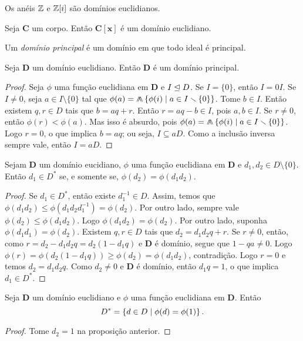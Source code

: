 \begin{exercise}
Os anéis $\mathbb{Z}$ e $\mathbb{Z}[i]$ são domínios euclidianos.
\end{exercise}

\begin{exercise}
Seja $\bm C$ um corpo. Então $\bm{C[x]}$ é um domínio euclidiano.
\end{exercise}

\begin{definition}
Um \emph{domínio principal} é um domínio em que todo ideal é principal.
\end{definition}

\begin{proposition}
 Seja $\bm D$ um domínio euclidiano. Então $\bm D$ é um domínio principal.
\end{proposition}
\begin{proof}
Seja $\phi$ uma função euclidiana em $\bm D$ e $I \mathrel{\unlhd} D$. Se $I = \{0\}$, então $I = 0I$. Se $I \neq 0$, seja $a \in I \setminus \{0\}$ tal que $\phi(a) = \min\set{\phi(i)}{a \in I \setminus \{0\}}$. Tome $b \in I$. Então existem $q,r \in D$ tais que $b=aq+r$. Então $r = aq-b \in I$, pois $a,b \in I$. Se $r \neq 0$, então $\phi(r) < \phi(a)$. Mas isso é absurdo, pois $\phi(a) = \min\set{\phi(i)}{a \in I \setminus \{0\}}$. Logo $r=0$, o que implica $b=aq$; ou seja, $I \subseteq aD$. Como a inclusão inversa sempre vale, então $I=aD$.
\end{proof}

\begin{proposition}
Sejam $\bm D$ um domínio eucidiano, $\phi$ uma função euclidiana em $\bm D$ e $d_1,d_2 \in D \setminus \{0\}$. Então $d_1 \in D^*$ se, e somente se, $\phi(d_2) = \phi(d_1d_2)$.
\end{proposition}
\begin{proof}
	Se $d_1 \in D^*$, então existe $d_1^{-1} \in D$. Assim, temos que $\phi(d_1d_2) \leq \phi(d_1d_2d_1^{-1})=\phi(d_2)$. Por outro lado, sempre vale $\phi(d_2) \leq \phi(d_1d_2)$. Logo $\phi(d_1d_2)=\phi(d_2)$. Por outro lado, suponha $\phi(d_1d_1)=\phi(d_2)$. Existem $q,r \in D$ tais que $d_2 = d_1d_2q+r$. Se $r \neq 0$, então, como $r = d_2-d_1d_2q = d_2(1-d_1q)$ e $\bm D$ é domínio, segue que $1-qa \neq 0$. Logo $\phi(r)=\phi(d_2(1-d_1q)) \geq \phi(d_2) = \phi(d_1d_2)$, contradição. Logo $r=0$ e temos $d_2=d_1d_2q$. Como $d_2 \neq 0$ e $\bm D$ é domínio, então $d_1q = 1$, o que implica $d_1 \in D^*$.
\end{proof}

\begin{proposition}
Seja $\bm D$ um domínio euclidiano e $\phi$ uma função euclidiana em $\bm D$. Então
	\begin{equation*}
	D^* = \left\{{d \in D}\;\middle\vert\;{\phi(d)=\phi(1)}\right\}.
	\end{equation*}
\end{proposition}
\begin{proof}
Tome $d_2=1$ na proposição anterior.
\end{proof}

